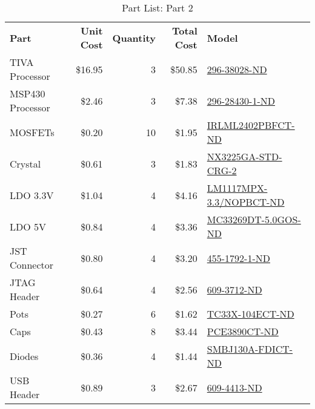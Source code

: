 \begin{table}[h]
    \caption{Part List: Part 2}
    \vspace{1.0em}
    \begin{tabular}{lrrrl}
        \textbf{Part} & \textbf{Unit Cost} & \textbf{Quantity} & \textbf{Total Cost} & \textbf{Model}\\
        TIVA Processor & \$16.95 & 3 & \$50.85 & \href{https://www.digikey.com/product-detail/en/TM4C1294NCPDTI3/296-38028-ND/4914951}{296-38028-ND}\\
        MSP430 Processor & \$2.46 & 3 & \$7.38 & \href{https://www.digikey.com/product-detail/en/MSP430G2553IPW20R/296-28430-1-ND/2638889}{296-28430-1-ND}\\
        MOSFETs & \$0.20 & 10 & \$1.95 & \href{https://www.digikey.com/product-detail/en/IRLML2402TRPBF/IRLML2402PBFCT-ND/812508}{IRLML2402PBFCT-ND}\\
        Crystal & \$0.61 & 3 & \$1.83 & \href{https://www.digikey.com/product-detail/en/NX3225GA-25.000M-STD-CRG-2/644-1259-1-ND/5022991}{NX3225GA-STD-CRG-2}\\
        LDO 3.3V & \$1.04 & 4 & \$4.16 & \href{https://www.digikey.com/product-detail/en/LM1117MPX-3.3\%2FNOPB/LM1117MPX-3.3\%2FNOPBCT-ND/1010516}{LM1117MPX-3.3/NOPBCT-ND}\\
        LDO 5V & \$0.84 & 4 & \$3.36 & \href{https://www.digikey.com/product-detail/en/MC33269DT-5.0G/MC33269DT-5.0GOS-ND/1479179}{MC33269DT-5.0GOS-ND}\\
        JST Connector & \$0.80 & 4 & \$3.20 & \href{https://www.digikey.com/product-detail/en/BM06B-SRSS-TB(LF)(SN)/455-1792-1-ND/926863}{455-1792-1-ND}\\
        JTAG Header & \$0.64 & 4 & \$2.56 & \href{https://www.digikey.com/product-detail/en/20021111-00010T4LF/609-3712-ND/2209072}{609-3712-ND}\\
        Pots & \$0.27 & 6 & \$1.62 & \href{https://www.digikey.com/product-detail/en/TC33X-2-104E/TC33X-104ECT-ND/612912}{TC33X-104ECT-ND}\\
        Caps & \$0.43 & 8 & \$3.44 & \href{https://www.digikey.com/product-detail/en/EEE-1CA470WR/PCE3890CT-ND/766266}{PCE3890CT-ND}\\
        Diodes & \$0.36 & 4 & \$1.44 & \href{https://www.digikey.com/product-detail/en/SMBJ130A-13-F/SMBJ130A-FDICT-ND/816052}{SMBJ130A-FDICT-ND}\\
        USB Header & \$0.89 & 3 & \$2.67 & \href{https://www.digikey.com/product-detail/en/SMBJ130A-13-F/SMBJ130A-FDICT-ND/816052}{609-4413-ND}\\

\end{tabular}
\end{table}
